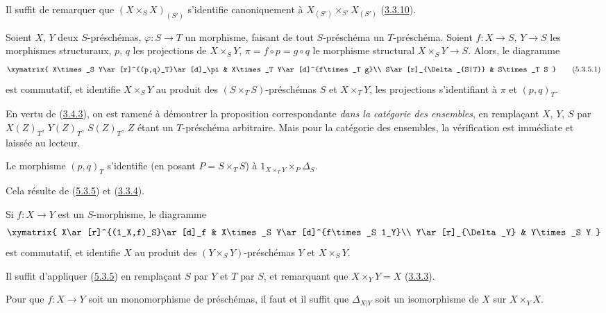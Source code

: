 Il suffit de remarquer que $(X\times_S X)_{(S')}$ s'identifie canoniquement à
$X_{(S')}\times_{S'}X_{(S')}$
(\hyperref[I.3.3.10-fr]{3.3.10}).

\begin{proposition}[5.3.5]
\label{I.5.3.5-fr}
Soient $X$, $Y$ deux $S$-préschémas, $\varphi:S\to T$ un morphisme, faisant de
tout $S$-préschéma un $T$-préschéma. Soient $f:X\to S$, $Y\to S$ les
morphismes structuraux, $p$, $q$ les projections de $X\times_S Y$,
$\pi=f\circ p=g\circ q$ le morphisme structural $X\times_S Y\to S$. Alors, le
diagramme
\[
  \xymatrix{
    X\times_S Y\ar[r]^{(p,q)_T}\ar[d]_\pi &
    X\times_T Y\ar[d]^{f\times_T g}\\
    S\ar[r]_{\Delta_{S|T}} &
    S\times_T S
  }
  \tag{5.3.5.1}\label{I.5.3.5.1-fr}
\]
est commutatif, et identifie $X\times_S Y$ au produit des
$(S\times_T S)$-préschémas $S$ et $X\times_T Y$, les projections
s'identifiant à $\pi$ et $(p,q)_T$.
\end{proposition}

En vertu de (\hyperref[I.3.4.3-fr]{3.4.3}), on est ramené à démontrer la
proposition correspondante \emph{dans la catégorie des ensembles}, en
remplaçant $X$, $Y$, $S$ par $X(Z)_T$, $Y(Z)_T$, $S(Z)_T$, $Z$ étant un
$T$-préschéma arbitraire. Mais pour la catégorie des ensembles, la vérification
est immédiate et laissée au lecteur.

\begin{corollary}[5.3.6]
\label{I.5.3.6-fr}
Le morphisme $(p,q)_T$ s'identifie (en posant $P=S\times_T S$) à
$1_{X\times_T Y}\times_P\Delta_S$.
\end{corollary}

Cela résulte de (\hyperref[I.5.3.5-fr]{5.3.5}) et
(\hyperref[I.3.3.4-fr]{3.3.4}).

\begin{corollary}[5.3.7]
\label{I.5.3.7-fr}
Si $f:X\to Y$ est un $S$-morphisme, le diagramme
\[
  \xymatrix{
    X\ar[r]^{(1_X,f)_S}\ar[d]_f &
    X\times_S Y\ar[d]^{f\times_S 1_Y}\\
    Y\ar[r]_{\Delta_Y} &
    Y\times_S Y
  }
\]
est commutatif, et identifie $X$ au produit des
$(Y\times_S Y)$-préschémas $Y$ et $X\times_S Y$.
\end{corollary}

Il suffit d'appliquer (\hyperref[I.5.3.5-fr]{5.3.5}) en remplaçant $S$ par
$Y$ et $T$ par $S$, et remarquant que $X\times_Y Y=X$
(\hyperref[I.3.3.3-fr]{3.3.3}).

\begin{proposition}[5.3.8]
\label{I.5.3.8-fr}
Pour que $f:X\to Y$ soit un monomorphisme de préschémas, il faut et il suffit
que $\Delta_{X|Y}$ soit un isomorphisme de $X$ sur $X\times_Y X$.
\end{proposition}

